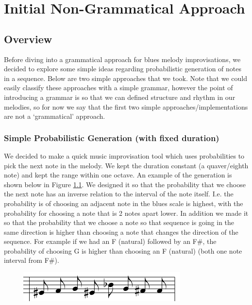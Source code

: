 \documentclass[pdftex,12pt,a4paper]{report}
\begin{document}
\pagebreak

\chapter{Initial Non-Grammatical Approach}

\section{Overview}
Before diving into a grammatical approach for blues melody improvisations, we decided to explore some simple ideas regarding probabilistic generation of notes in a sequence. Below are two simple approaches that we took. Note that we could easily classify these approaches with a simple grammar, however the point of introducing a grammar is so that we can defined structure and rhythm in our melodies, so for now we say that the first two simple approaches/implementations are not a `grammatical' approach. 

\subsection{Simple Probabilistic Generation (with fixed duration)}
We decided to make a quick music improvisation tool which uses probabilities to pick the next note in the melody. We kept the duration constant (a quaver/eighth note) and kept the range within one octave. An example of the generation is shown below in Figure \ref{fig:probabilisticgeneration}. We designed it so that the probability that we choose the next note has an inverse relation to the interval of the note itself. I.e. the probability is of choosing an adjacent note in the blues scale is highest, with the probability for choosing a note that is 2 notes apart lower. In addition we made it so that the probability that we choose a note so that sequence is going in the same direction is higher than choosing a note that changes the direction of the sequence. For example if we had an F (natural) followed by an F\#, the probability of choosing G is higher than choosing an F (natural) (both one note interval from F\#).

\begin{figure}[here]
  \centering
  \includegraphics[scale=0.7]{figure/randomgeneration.png}
  \label{fig:probabilisticgeneration}
\end{figure}
\end{document}
